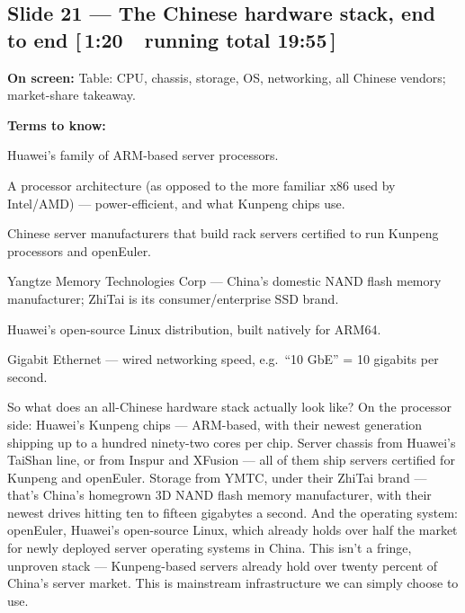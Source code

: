 \documentclass[11pt]{article}
\newcommand{\onscreen}[1]{\noindent\textbf{\color{sovGrey}On screen:} #1\par\vspace{4pt}}
\newcommand{\timing}[2]{\hfill{\normalsize\color{sovGrey}[\,#1\ \textbar\ running total #2\,]}}
\newenvironment{terms}
  {\noindent\textbf{\color{sovGrey}Terms to know:}
   \begin{description}[leftmargin=0pt,style=sameline,labelindent=0pt,itemsep=2pt,topsep=2pt,font=\normalfont\bfseries\color{sovDark}]}
  {\end{description}\vspace{2pt}}
\begin{document}
\subsection*{Slide 21 --- The Chinese hardware stack, end to end \timing{1:20}{19:55}}
\onscreen{Table: CPU, chassis, storage, OS, networking, all Chinese vendors; market-share
takeaway.}
\begin{terms}
  \item[Kunpeng] Huawei's family of ARM-based server processors.
  \item[ARM64] A processor architecture (as opposed to the more familiar x86 used by
    Intel/AMD) --- power-efficient, and what Kunpeng chips use.
  \item[TaiShan / Inspur / XFusion] Chinese server manufacturers that build rack
    servers certified to run Kunpeng processors and openEuler.
  \item[YMTC / ZhiTai] Yangtze Memory Technologies Corp --- China's domestic NAND
    flash memory manufacturer; ZhiTai is its consumer/enterprise SSD brand.
  \item[openEuler] Huawei's open-source Linux distribution, built natively for ARM64.
  \item[GbE] Gigabit Ethernet --- wired networking speed, e.g.\ ``10 GbE'' = 10
    gigabits per second.
\end{terms}
\begin{sayit}
So what does an all-Chinese hardware stack actually look like? On the processor side:
Huawei's Kunpeng chips --- ARM-based, with their newest generation shipping up to a
hundred ninety-two cores per chip. Server chassis from Huawei's TaiShan line, or from
Inspur and XFusion --- all of them ship servers certified for Kunpeng and openEuler.
Storage from YMTC, under their ZhiTai brand --- that's China's homegrown 3D NAND flash
memory manufacturer, with their newest drives hitting ten to fifteen gigabytes a second.
And the operating system: openEuler, Huawei's open-source Linux, which already holds
over half the market for newly deployed server operating systems in China. This isn't a
fringe, unproven stack --- Kunpeng-based servers already hold over twenty percent of
China's server market. This is mainstream infrastructure we can simply choose to use.
\end{sayit}
\end{document}
